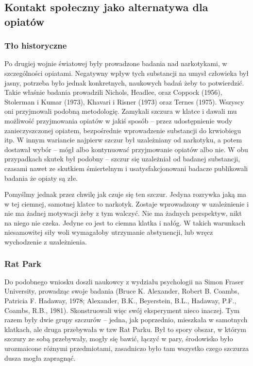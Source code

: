 \documentclass{psychol}
\begin{document}
\subsection{Kontakt społeczny jako alternatywa dla opiatów}

\subsubsection{Tło historyczne}

Po drugiej wojnie światowej były prowadzone badania nad narkotykami, w szczególności opiatami. Negatywny wpływ tych substancji na umysł człowieka był jasny, potrzeba było jednak konkretnych, naukowych badań żeby to potwierdzić. Takie właśnie badania prowadzili Nichols, Headlee, oraz Coppock (1956), Stolerman i Kumar (1973), Khavari i Risner (1973) oraz Ternes (1975). Wszyscy oni przyjmowali podobną metodologię. Zamykali szczura w klatce i dawali mu możliwość przyjmowania opiatów w jakiś sposób -- przez udostępnienie wody zanieczyszczonej opiatem, bezpośrednie wprowadzenie substancji do krwiobiegu itp. W innym wariancie najpierw szczur był uzależniany od narkotyku, a potem dostawał wybór -- mógł albo kontynuować przyjmowanie opiatów albo nie. W obu przypadkach skutek był podobny -- szczur się uzależniał od badanej substancji, czasami nawet ze skutkiem śmiertelnym i usatysfakcjonowani badacze publikowali badania że opiaty są złe.

Pomyślmy jednak przez chwilę jak czuje się ten szczur. Jedyna rozrywka jaką ma w tej ciemnej, samotnej klatce to narkotyk. Zostaje wprowadzony w uzależnienie i nie ma żadnej motywacji żeby z tym walczyć. Nie ma żadnych perspektyw, nikt na niego nie czeka. Jedyne co jest to ciemna klatka i nałóg. W takich warunkach niesamowitej siły woli wymagałoby utrzymanie abstynencji, lub wręcz wychodzenie z uzależnienia.

\subsubsection{Rat Park}

Do podobnego wniosku doszli naukowcy z wydziału psychologii na Simon Fraser University, prowadząc swoje badania (Bruce K. Alexander, Robert B. Coambs, Patricia F. Hadaway, 1978; Alexander, B.K., Beyerstein, B.L., Hadaway, P.F., Coambs, R.B., 1981). Skonstruowali więc swój eksperyment nieco inaczej. Tym razem były dwie grupy szczurów -- jedna, jak poprzednio, mieszkała w samotnych klatkach, ale druga przebywała w tzw Rat Parku. Był to spory obszar, w którym szczury ze sobą przebywały, mogły się bawić, łączyć w pary, środowisko było urozmaicone różnymi przedmiotami, zasadniczo było tam wszystko czego szczurza dusza mogła zapragnąć.
\end{document}
